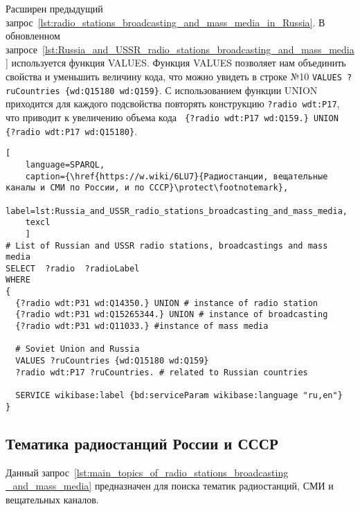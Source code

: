 
\newpage

Расширен предыдущий запрос~\ref{lst:radio_stations_broadcasting_and_mass_media_in_Russia}. В обновленном запросе~\ref{lst:Russia_and_USSR_radio_stations_broadcasting_and_mass_media} используется функция VALUES.  Функция VALUES позволяет нам объединить свойства и уменьшить величину кода, что можно увидеть в строке №10 \lstinline|VALUES ?ruCountries {wd:Q15180 wd:Q159}|. С использованием функции UNION приходится для каждого подсвойства повторять конструкцию \lstinline|?radio wdt:P17|, что приводит к увеличению объема кода \lstinline| {?radio wdt:P17 wd:Q159.} UNION 
    {?radio wdt:P17 wd:Q15180}|.

\begin{lstlisting}[ 
    language=SPARQL,
    caption={\href{https://w.wiki/6LU7}{Радиостанции, вещательные каналы и СМИ по России, и по СССР}\protect\footnotemark},
    label=lst:Russia_and_USSR_radio_stations_broadcasting_and_mass_media,
    texcl
    ]
# List of Russian and USSR radio stations, broadcastings and mass media
SELECT  ?radio  ?radioLabel
WHERE
{
  {?radio wdt:P31 wd:Q14350.} UNION # instance of radio station
  {?radio wdt:P31 wd:Q15265344.} UNION # instance of broadcasting
  {?radio wdt:P31 wd:Q11033.} #instance of mass media
  
  # Soviet Union and Russia
  VALUES ?ruCountries {wd:Q15180 wd:Q159}
  ?radio wdt:P17 ?ruCountries. # related to Russian countries
  
  SERVICE wikibase:label {bd:serviceParam wikibase:language "ru,en"}
}\end{lstlisting}%


\newpage

\subsection{Тематика радиостанций России и СССР}

Данный запрос~\ref{lst:main_topics_of_radio_stations_broadcasting _and_mass_media} предназначен для поиска тематик радиостанций, СМИ и вещательных каналов.


